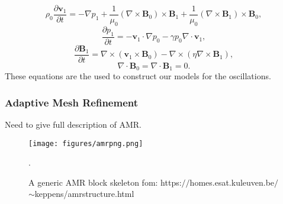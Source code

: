 \documentclass[12pt]{ociamthesis}
\begin{document}
\begin{equation}
\rho_0 \frac{\partial \boldsymbol{v}_1}{\partial t}  = - \nabla p_1 + \frac{1}{\mu_0} (\nabla \times \boldsymbol{B}_0) \times \boldsymbol{B}_1 + \frac{1}{\mu_0} (\nabla \times \boldsymbol{B}_1) \times \boldsymbol{B}_0 ,
\end{equation}
\begin{equation}
\frac{\partial p_1}{\partial t} = - \boldsymbol{v}_1 \cdot \nabla p_0 - \gamma p_0 \nabla \cdot \boldsymbol{v}_1 , 
\end{equation}
\begin{equation}
\frac{\partial \boldsymbol{B}_1}{\partial t} = \nabla \times (\boldsymbol{v}_1 \times \boldsymbol{B}_0) - \nabla \times (\eta \nabla \times \boldsymbol{B}_1) ,
\end{equation}
\begin{equation}
\nabla \cdot \boldsymbol{B}_0 = \nabla \cdot \boldsymbol{B}_1 = 0 .
\end{equation}
These equations are the used to construct our models for the oscillations. 
\subsubsection{Adaptive Mesh Refinement}
Need to give full description of AMR. 
\begin{figure}
\centering
\texttt{[image: figures/amrpng.png]}
\caption{A generic AMR block skeleton fom: https:$//$homes.esat.kuleuven.be$/$ $\sim$keppens/amrstructure.html}.
\label{amr_scheme}
\end{figure}   
\end{document}

